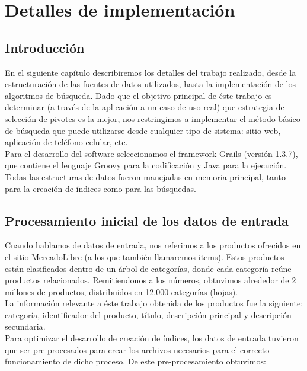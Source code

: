 	\chapter{Detalles de implementaci\'on}

\section{Introducci\'on}

En el siguiente cap\'itulo describiremos los detalles del trabajo realizado, desde la estructuraci\'on de las fuentes de datos utilizados, hasta la implementaci\'on de los algoritmos de b\'usqueda. Dado que el objetivo principal de \'este trabajo es determinar (a trav\'es de la aplicaci\'on a un caso de uso real) que estrategia de selecci\'on de pivotes es la mejor, nos restringimos a implementar el m\'etodo b\'asico de b\'usqueda que puede utilizarse desde cualquier tipo de sistema: sitio web, aplicaci\'on de tel\'efono celular, etc.\\

Para el desarrollo del software seleccionamos el framework Grails (versi\'on 1.3.7), que contiene el lenguaje Groovy para la codificaci\'on y Java para la ejecuci\'on.\\

Todas las estructuras de datos fueron manejadas en memoria principal, tanto para la creaci\'on de \'indices como para las b\'usquedas.


\section{Procesamiento inicial de los datos de entrada} \label{proc-inic}

Cuando hablamos de datos de entrada, nos referimos a los productos ofrecidos en el sitio MercadoLibre (a los que tambi\'en llamaremos items). Estos productos est\'an clasificados dentro de un \'arbol de categor\'ias, donde cada categor\'ia re\'une productos relacionados. Remitiendonos a los n\'umeros, obtuvimos alrededor de 2 millones de productos, distribuidos en 12.000 categor\'ias (hojas).\\

La informaci\'on relevante a \'este trabajo obtenida de los productos fue la siguiente: categor\'ia, identificador del producto, t\'itulo, descripci\'on principal y descripci\'on secundaria.\\

Para optimizar el desarrollo de creaci\'on de \'indices, los datos de entrada tuvieron que ser pre-procesados para crear los archivos necesarios para el correcto funcionamiento de dicho proceso. De este pre-procesamiento obtuvimos:

